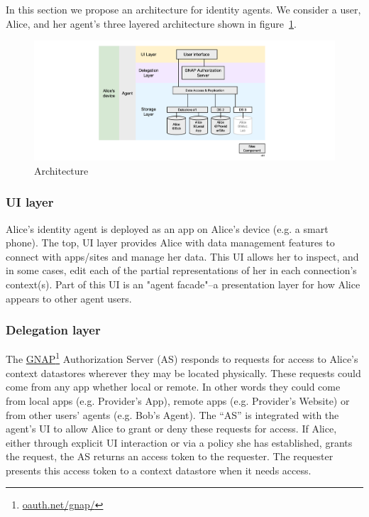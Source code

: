 \documentclass[11pt, oneside]{article}   	%
\newcommand{\hyperfootnote}[1][]{\def\ArgI{{#1}}\hyperfootnoteRelay}
\newcommand\hyperfootnoteRelay[2][]{\href{#1#2}{\ArgI}\footnote{\href{#1#2}{#2}}}
\begin{document}
In this section we propose an architecture for identity agents. We consider a user, Alice, and her agent's three layered architecture shown in figure~\ref{fig:architecture}.
\begin{figure}[htbp]
\includegraphics[width=\textwidth]{./images/architecture.png}
\caption{Architecture}
\label{fig:architecture}
\end{figure}

\subsubsection{UI layer}

Alice's identity agent is deployed as an app on Alice's device (e.g. a smart phone). The top, UI layer provides Alice with data management features to connect with apps/sites and manage her data. This UI allows her to inspect, and in some cases, edit each of the partial representations of her in each connection's context(s). Part of this UI is an "agent facade"--a presentation layer for how Alice appears to other agent users. 

\subsubsection{Delegation layer}

The \hyperfootnote[GNAP][https://]{oauth.net/gnap/} Authorization Server (AS) responds to requests for access to Alice's context datastores wherever they may be located physically. These requests could come from any app whether local or remote. In other words they could come from local apps (e.g. Provider's App), remote apps (e.g. Provider's Website) or from other users' agents (e.g. Bob's Agent). The ``AS'' is integrated with the agent's UI to allow Alice to grant or deny these requests for access. If Alice, either through explicit UI interaction or via a policy she has established, grants the request, the AS returns an access token to the requester. The requester presents this access token to a context datastore when it needs access. 
\end{document}
